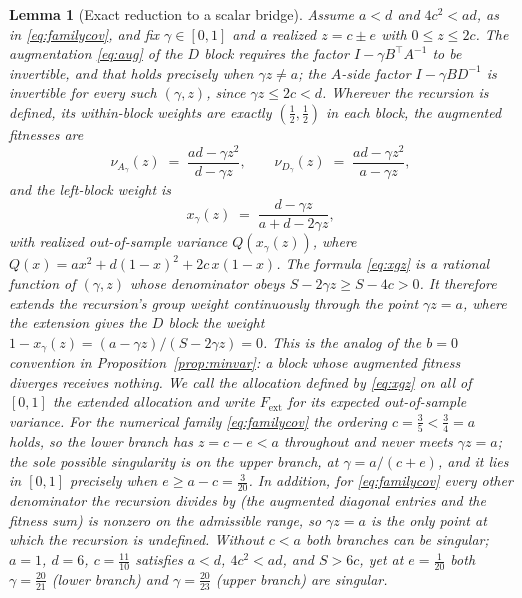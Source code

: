\documentclass[11pt]{article}
\newtheorem{lemma}{Lemma}
\theoremstyle{remark}
\begin{document}
\begin{lemma}[Exact reduction to a scalar bridge]
\label{lem:reduce}
Assume $a < d$ and $4c^2 < ad$, as in \eqref{eq:familycov}, and fix
$\gamma \in [0,1]$ and a realized $z = c \pm e$ with $0 \le z \le 2c$. The
augmentation \eqref{eq:aug} of the $D$ block requires the factor
$I - \gamma B^\top A^{-1}$ to be invertible, and that holds precisely when
$\gamma z \ne a$; the $A$-side factor $I - \gamma B D^{-1}$ is invertible
for every such $(\gamma, z)$, since $\gamma z \le 2c < d$. Wherever the
recursion is defined, its within-block weights are exactly
$(\tfrac12, \tfrac12)$ in each block, the augmented fitnesses are
\begin{equation}
  \nu_{A_\gamma}(z) \;=\; \frac{ad - \gamma z^2}{d - \gamma z},
  \qquad
  \nu_{D_\gamma}(z) \;=\; \frac{ad - \gamma z^2}{a - \gamma z},
  \label{eq:nuscalar}
\end{equation}
and the left-block weight is
\begin{equation}
  x_\gamma(z) \;=\; \frac{d - \gamma z}{a + d - 2\gamma z},
  \label{eq:xgz}
\end{equation}
with realized out-of-sample variance $Q(x_\gamma(z))$, where
$Q(x) = a x^2 + d(1-x)^2 + 2c\,x(1-x)$. The formula \eqref{eq:xgz} is a
rational function of $(\gamma, z)$ whose denominator obeys
$S - 2\gamma z \ge S - 4c > 0$. It therefore extends the recursion's group
weight continuously through the point $\gamma z = a$, where the extension
gives the $D$ block the weight
$1 - x_\gamma(z) = (a - \gamma z)/(S - 2\gamma z) = 0$. This is the analog
of the $b = 0$ convention in Proposition~\ref{prop:minvar}: a block whose
augmented fitness diverges receives nothing. We call the allocation defined
by \eqref{eq:xgz} on all of $[0,1]$ the \emph{extended} allocation and
write $F_{\mathrm{ext}}$ for its expected out-of-sample variance. For the
numerical family \eqref{eq:familycov} the ordering $c = \tfrac35 < \tfrac34
= a$ holds, so the lower branch has $z = c - e < a$ throughout and never
meets $\gamma z = a$; the sole possible singularity is on the upper branch,
at $\gamma = a/(c+e)$, and it lies in $[0,1]$ precisely when
$e \ge a - c = \tfrac{3}{20}$. In addition, for \eqref{eq:familycov} every
other denominator the recursion divides by (the augmented diagonal entries
and the fitness sum) is nonzero on the admissible range, so $\gamma z = a$
is the only point at which the recursion is undefined. Without $c < a$ both
branches can be singular; $a = 1$, $d = 6$, $c = \tfrac{11}{10}$ satisfies
$a < d$, $4c^2 < ad$, and $S > 6c$, yet at $e = \tfrac{1}{20}$ both
$\gamma = \tfrac{20}{21}$ (lower branch) and $\gamma = \tfrac{20}{23}$
(upper branch) are singular.
\end{lemma}
\end{document}

